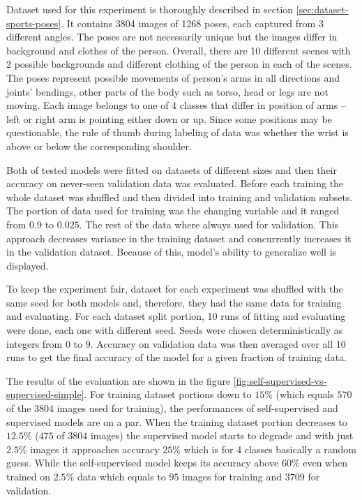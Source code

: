 Dataset used for this experiment is thoroughly described in section \ref{sec:dataset-sports-poses}. It contains 3804 images of 1268 poses, each captured from 3 different angles. The poses are not necessarily unique but the images differ in background and clothes of the person. Overall, there are 10 different scenes with 2 possible backgrounds and different clothing of the person in each of the scenes. The poses represent possible movements of person's arms in all directions and joints' bendings, other parts of the body such as torso, head or legs are not moving. Each image belongs to one of 4 classes that differ in position of arms -- left or right arm is pointing either down or up. Since some positions may be questionable, the rule of thumb during labeling of data was whether the wrist is above or below the corresponding shoulder.

Both of tested models were fitted on datasets of different sizes and then their accuracy on never-seen validation data was evaluated. Before each training the whole dataset was shuffled and then divided into training and validation subsets. The portion of data used for training was the changing variable and it ranged from $0.9$ to $0.025$. The rest of the data where always used for validation. This approach decreases variance in the training dataset and concurrently increases it in the validation dataset. Because of this, model's ability to generalize well is displayed.

To keep the experiment fair, dataset for each experiment was shuffled with the same seed for both models and, therefore, they had the same data for training and evaluating. For each dataset split portion, 10 runs of fitting and evaluating were done, each one with different seed. Seeds were chosen deterministically as integers from $0$ to $9$. Accuracy on validation data was then averaged over all 10 runs to get the final accuracy of the model for a given fraction of training data.

The results of the evaluation are shown in the figure \ref{fig:self-supervised-vs-supervised-simple}. For training dataset portions down to $15 \%$ (which equals $570$ of the $3804$ images used for training), the performances of self-supervised and supervised models are on a par. When the training dataset portion decreases to $12.5 \%$ ($475$ of $3804$ images) the supervised model starts to degrade and with just $2.5 \%$ images it approaches accuracy $25 \%$ which is for 4 classes basically a random guess. While the self-supervised model keeps its accuracy above $60 \%$ even when trained on $2.5 \%$ data which equals to $95$ images for training and $3709$ for validation.

